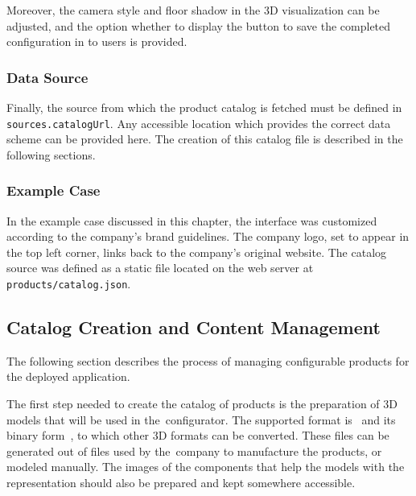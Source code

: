 Moreover, the camera style and floor shadow in the 3D visualization can be adjusted, and the option whether to display the button to save the completed configuration in  to users is provided.


\subsubsection{Data Source}

Finally, the source from which the product catalog is fetched must be defined in \texttt{sources.catalogUrl}. Any accessible location which provides the correct data scheme can be provided here. The creation of this catalog file is described in the following sections.


\subsubsection{Example Case}

In the example case discussed in this chapter, the interface was customized according to the company's brand guidelines. The company logo, set to appear in the top left corner, links back to the company's original website. The catalog source was defined as a static file located on the web server at \texttt{products/catalog.json}.


\subsection{Catalog Creation and Content Management}

The following section describes the process of managing configurable products for the deployed application.

The first step needed to create the catalog of products is the preparation of 3D models that will be used in the~configurator. The supported format is~ and its binary form~, to which other 3D formats can be converted. These files can be generated out of  files used by the~company to manufacture the products, or modeled manually. The images of the components that help the models with the representation should also be prepared and kept somewhere accessible.

